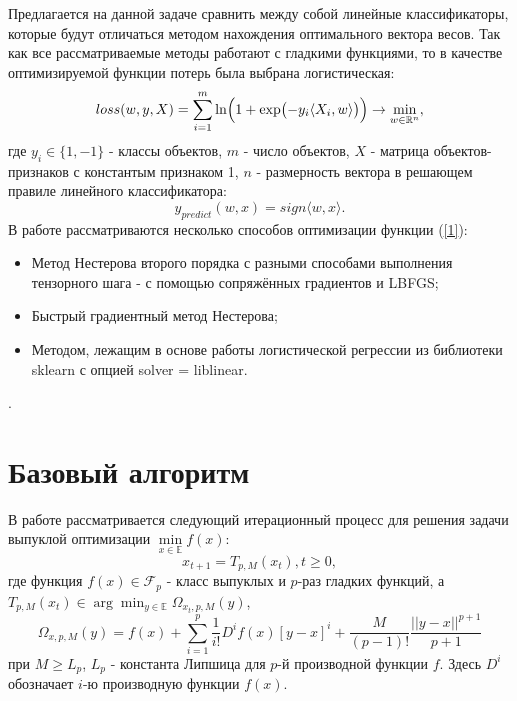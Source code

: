 \documentclass[12pt,twoside]{article}
\begin{document}
	Предлагается на данной задаче сравнить между собой линейные классификаторы, которые будут отличаться методом нахождения оптимального вектора весов. Так как все рассматриваемые методы работают с гладкими функциями, то в качестве оптимизируемой функции потерь была выбрана логистическая:
	\begin{equation} \label{1}
	loss(w, y, X) = \sum\limits_{i = 1}^m \ln\Bigl(1 + \exp\bigl(-y_i\langle X_i, w \rangle\bigr)\Bigr) \to \min_{w \in \mathbb{R}^n}, 
	\end{equation}
	где $y_i \in \{1, -1\}$ - классы объектов, $m$ - число объектов, $X$ - матрица объектов-признаков с константым признаком 1, $n$ - размерность вектора в решающем правиле линейного классификатора:
	\begin{equation}
	y_{predict}(w, x) = sign \langle w, x\rangle.
	\end{equation}
	В работе рассматриваются несколько способов оптимизации функции (\ref{1}): 
	\begin{itemize}
		\item Метод Нестерова второго порядка с разными способами выполнения тензорного шага - с помощью сопряжённых градиентов и LBFGS; 
		\item Быстрый градиентный метод Нестерова;
		\item Методом, лежащим в основе работы логистической регрессии из библиотеки sklearn с опцией solver = liblinear.
	\end{itemize}.
	\section{Базовый алгоритм}
	В работе \cite{nesterov2018implementable} рассматривается следующий итерационный процесс для решения задачи выпуклой оптимизации $\min\limits_{x \in \mathbb{E}} f(x)$:
	\begin{equation}
	x_{t + 1} = T_{p, M}(x_t), t \geq 0,
	\end{equation}
	где функция $f(x) \in \mathcal{F}_p$ - класс выпуклых и $p$-раз гладких функций, а $T_{p, M}(x_t) \in \arg\min_{y \in \mathbb{E}}\Omega_{x_t, p, M}(y)$, 
	\begin{equation}
	\Omega_{x, p, M}(y) = f(x) +  \sum\limits_{i = 1}^p \frac{1}{i!}D^if(x)[y - x]^i + \frac{M}{(p - 1)!}\frac{||y - x||^{p + 1}}{p + 1}
	\end{equation}
	при $M \geq L_p$, $L_p$ - константа Липшица для $p$-й производной функции $f$. Здесь $D^i$ обозначает $i$-ю производную функции $f(x)$.
	
\end{document}
